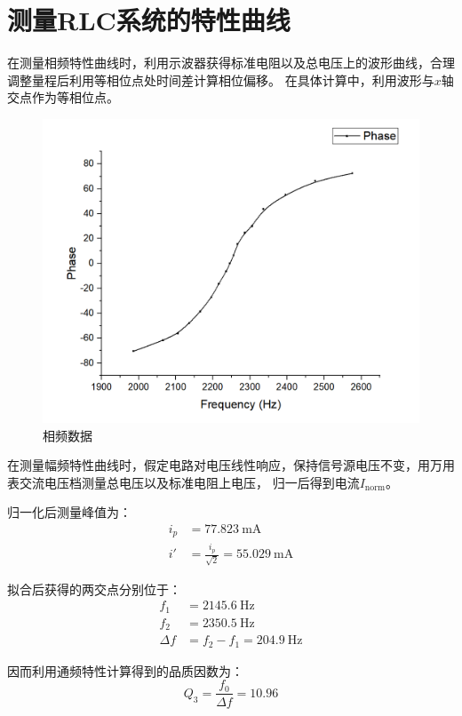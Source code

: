 \documentclass{ctexart}
\begin{document}
    \section{测量RLC系统的特性曲线}
    在测量相频特性曲线时，利用示波器获得标准电阻以及总电压上的波形曲线，合理调整量程后利用等相位点处时间差计算相位偏移。
    在具体计算中，利用波形与$x$轴交点作为等相位点。
    \begin{figure}[h]
        \includegraphics[width=\textwidth]{rlc_1.png}
        \caption{相频数据}
    \end{figure}

    在测量幅频特性曲线时，假定电路对电压线性响应，保持信号源电压不变，用万用表交流电压档测量总电压以及标准电阻上电压，
    归一后得到电流$I_\mathrm{norm}$。

    归一化后测量峰值为：
    \begin{align}
        i_p &= 77.823 \ \mathrm{mA} \\
        i' &= \frac{i_p}{\sqrt{2}} = 55.029 \ \mathrm{mA}
    \end{align}

    拟合后获得的两交点分别位于：
    \begin{align}
        f_1 &= 2145.6 \ \mathrm{Hz} \\
        f_2 &= 2350.5 \ \mathrm{Hz} \\
        \Delta f &= f_2 - f_1 = 204.9 \ \mathrm{Hz}
    \end{align}

    因而利用通频特性计算得到的品质因数为：
    \begin{equation}
        Q_3 = \frac{f_0}{\Delta f} = 10.96
    \end{equation}
\end{document}
